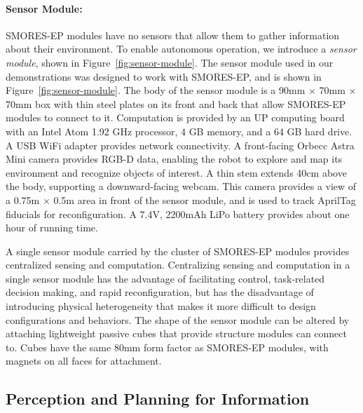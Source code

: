 \documentclass[12pt]{article}
\begin{document}
\paragraph{Sensor Module:} %
\label{sec:sensor_module}
%
SMORES-EP modules have no sensors that allow them to gather information about their environment. To enable autonomous operation, we introduce a \textit{sensor module}, shown in Figure~\ref{fig:sensor-module}.
The sensor module used in our demonstrations was designed to work with SMORES-EP, and is shown in Figure~\ref{fig:sensor-module}.
The body of the sensor module is a 90mm $\times$ 70mm $\times$ 70mm box with thin steel plates on its front and back that allow SMORES-EP modules
to connect to it.
Computation is provided by an UP computing board with an Intel Atom 1.92 GHz
processor, 4 GB memory, and a 64 GB hard drive. A USB WiFi adapter provides
network connectivity. A front-facing Orbecc Astra Mini camera provides RGB-D
data, enabling the robot to explore and map its environment and recognize
objects of interest.  A thin stem extends 40cm above the body, supporting a
downward-facing webcam. This camera provides a view of a  0.75m $\times$ 0.5m area
in front of the sensor module, and is used to track AprilTag
\cite{olson2011apriltag} fiducials for reconfiguration. A 7.4V, 2200mAh LiPo
battery provides about one hour of running time.

A single sensor module carried by the cluster of SMORES-EP modules provides centralized sensing and computation.  Centralizing sensing and computation in a single sensor module has the advantage of facilitating control, task-related decision making, and rapid reconfiguration, but has the disadvantage of introducing physical heterogeneity that makes it more difficult to design configurations and behaviors.  The shape of the sensor module can be altered by attaching lightweight passive cubes that provide structure modules can connect to.  Cubes have the same 80mm form factor as SMORES-EP modules, with magnets on all faces for attachment. 
%


\subsection{Perception and Planning for Information}
\label{sec:exploration}
%
\end{document}
